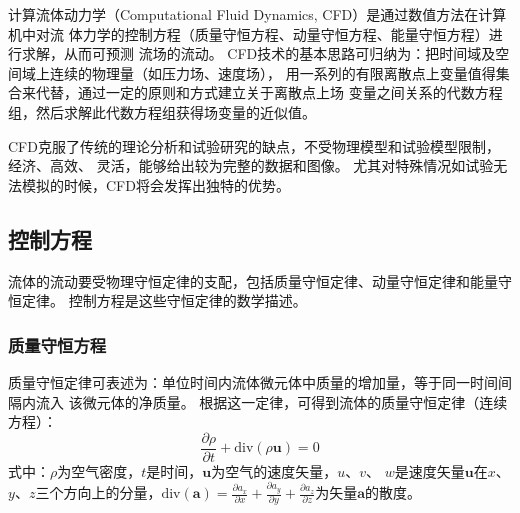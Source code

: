 计算流体动力学（Computational Fluid Dynamics, CFD）是通过数值方法在计算机中对流
体力学的控制方程（质量守恒方程、动量守恒方程、能量守恒方程）进行求解，从而可预测
流场的流动。
CFD技术的基本思路可归纳为：把时间域及空间域上连续的物理量（如压力场、速度场），
用一系列的有限离散点上变量值得集合来代替，通过一定的原则和方式建立关于离散点上场
变量之间关系的代数方程组，然后求解此代数方程组获得场变量的近似值。

CFD克服了传统的理论分析和试验研究的缺点，不受物理模型和试验模型限制，经济、高效、
灵活，能够给出较为完整的数据和图像。
尤其对特殊情况如试验无法模拟的时候，CFD将会发挥出独特的优势。

\subsection{控制方程}

流体的流动要受物理守恒定律的支配，包括质量守恒定律、动量守恒定律和能量守恒定律。
控制方程是这些守恒定律的数学描述\cite{wang2004cfd}。

\subsubsection{质量守恒方程}
质量守恒定律可表述为：单位时间内流体微元体中质量的增加量，等于同一时间间隔内流入
该微元体的净质量。
根据这一定律，可得到流体的质量守恒定律（连续方程）：
\begin{equation}
  \label{eq:continuity}
  \frac{\partial \rho}{\partial t} + \mathrm{div} (\rho \bm{u}) = 0
\end{equation}
式中：$ \rho $为空气密度，$ t $是时间，$ \bm{u} $为空气的速度矢量，$ u $、$ v $、
$ w $是速度矢量$ \bm{u} $在$ x $、$ y $、$ z $三个方向上的分量，$ \mathrm{div}
(\bm{a}) = \frac{\partial a_x }{\partial x } + \frac{\partial a_y }{\partial y }
+ \frac{\partial a_z  }{\partial z } $为矢量$ \bm{a} $的散度。

